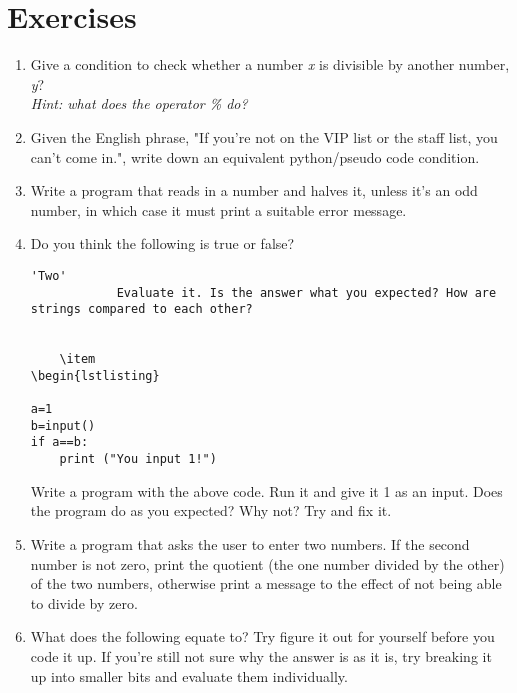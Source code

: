 \section{Exercises}
\begin{enumerate}
	\item Give a condition to check whether a number \textit{x} is divisible by another number, \textit{y}? 
\\\textit{Hint: what does the operator \textit{\%} do?}
	\item Given the English phrase, "If you're not on the VIP list or    the staff list, you can't come in.", write down an equivalent python/pseudo code    condition.
	\item Write a program that reads in a number and halves it, unless it's an odd number, in which case it must print a suitable error  message.
	\item Do you think the following is true or false?    
\begin{lstlisting}
'Two' 
			Evaluate it. Is the answer what you expected? How are strings compared to each other?

			
	\item 
\begin{lstlisting}

a=1
b=input()
if a==b:
	print ("You input 1!")
\end{lstlisting}
Write a program with the above code. Run it and give it 1 as an input. Does the program do as you expected? Why not? Try and fix it.
			

	\item Write a program that asks the user to enter two numbers. If the
			second number is not zero, print the quotient (the one number divided by the other) of the two numbers,
			otherwise print a message to the effect of not being able to divide
			by zero.
	\item What does the following equate to? Try figure it out for yourself before you code it up. If you're still not sure why the answer is as it is, try breaking it up into smaller bits and evaluate them individually.
			 

\end{enumerate}
